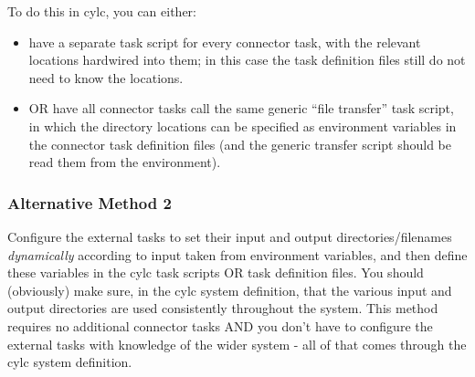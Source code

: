 \documentclass[11pt,a4paper]{article}
\begin{document}
To do this in cylc, you can either:

\begin{itemize}
    \item have a separate task script for every connector task, with the
        relevant locations hardwired into them; in this case the task
        definition files still do not need to know the locations.
    \item OR have all connector tasks call the same generic ``file
        transfer'' task script, in which the directory locations can be
        specified as environment variables in the connector task
        definition files (and the generic transfer script should be read
        them from the environment).
\end{itemize}

\subsubsection{Alternative Method 2}

Configure the external tasks to set their input and output
directories/filenames {\em dynamically} according to input taken from
environment variables, and then define these variables 
in the cylc task scripts OR task definition files. You should
(obviously) make sure, in the cylc system definition, that the various 
input and output directories are used consistently throughout the system. 
This method requires no additional connector tasks AND you don't have to
configure the external tasks with knowledge of the wider system - all of 
that comes through the cylc system definition. 

%
\end{document}
